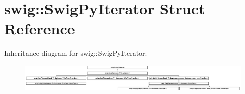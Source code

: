 \hypertarget{structswig_1_1SwigPyIterator}{}\section{swig\+:\+:Swig\+Py\+Iterator Struct Reference}
\label{structswig_1_1SwigPyIterator}
Inheritance diagram for swig\+:\+:Swig\+Py\+Iterator\+:\begin{figure}[H]
\begin{center}
\leavevmode
\includegraphics[height=1.313321cm]{structswig_1_1SwigPyIterator}
\end{center}
\end{figure}
